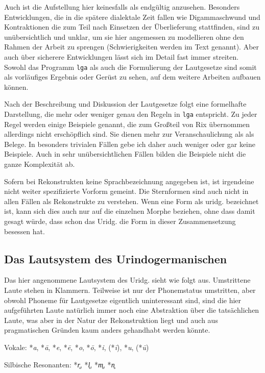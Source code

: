 \documentclass[12pt,a4paper,normalheadings]{scrartcl}
\def\rek#1{\mbox{*\textit{#1}}}
\def\tt#1{\texttt{#1}}
\begin{document}
Auch ist die Aufstellung hier keinesfalls als endgültig anzusehen.
Besonders Entwicklungen, die in die spätere dialektale Zeit fallen
wie Digammaschwund und Kontraktionen
die zum Teil nach Einsetzen der Überlieferung stattfinden,
sind zu unübersichtlich und unklar,
um sie hier angemessen zu modellieren ohne den Rahmen der Arbeit zu sprengen
(Schwierigkeiten werden im Text genannt).
Aber auch über sicherere Entwicklungen lässt sich im Detail fast immer streiten.
Sowohl das Programm \tt{lga} als auch die Formulierung
der Lautgesetze sind somit als vorläufiges Ergebnis oder Gerüst zu sehen,
auf dem weitere Arbeiten aufbauen können.

Nach der Beschreibung und Diskussion der Lautgesetze folgt eine
formelhafte Darstellung,
 die mehr oder weniger genau den Regeln in \tt{lga} entspricht.
Zu jeder Regel werden einige Beispiele genannt,
die zum Großteil von Rix übernommen
allerdings nicht erschöpflich sind.
Sie dienen mehr zur Veranschaulichung als als Belege.
In besonders trivialen Fällen gebe ich daher auch weniger oder
gar keine Beispiele.
Auch in sehr unübersichtlichen Fällen bilden die Beispiele nicht
die ganze Komplexität ab.

Sofern bei Rekonstrukten keine Sprachbezeichnung angegeben ist,
ist irgendeine nicht weiter spezifizierte Vorform gemeint.
Die Sternformen sind auch nicht in allen Fällen als
Rekonstrukte zu verstehen.
Wenn eine Form als uridg. bezeichnet ist,
kann sich dies auch nur auf die einzelnen Morphe beziehen,
ohne dass damit gesagt würde,
dass schon das Uridg. die Form in dieser Zusammensetzung besessen hat.

\subsection{Das Lautsystem des Urindogermanischen}

Das hier angenommene Lautsystem des Uridg. sieht wie folgt aus.
Umstrittene Laute stehen in Klammern.
Teilweise ist nur der Phonemstatus umstritten,
aber obwohl Phoneme für Lautgesetze eigentlich uninteressant sind,
sind die hier aufgeführten Laute natürlich immer noch
eine Abstraktion über die tatsächlichen Laute,
was aber in der Natur der Rekonstruktion liegt
und auch aus pragmatischen Gründen kaum anders gehandhabt werden könnte.

\bigskip
\noindent
Vokale: \rek{a}, \rek{ā}, \rek{e}, \rek{ē}, \rek{o}, \rek{ō},
\rek{i}, (\rek{ī}), \rek{u}, (\rek{ū})

\noindent
Silbische Resonanten: \rek{r̥}, \rek{l̥}, \rek{m̥}, \rek{n̥}
\end{document}
